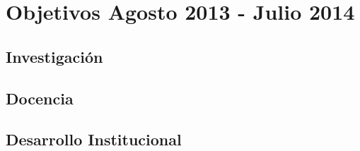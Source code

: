 \documentclass{article}
\begin{document}
\section*{Objetivos Agosto 2013 - Julio 2014}
\subsection*{Investigaci\'on}
\subsection*{Docencia}
\subsection*{Desarrollo Institucional}
\end{document}

